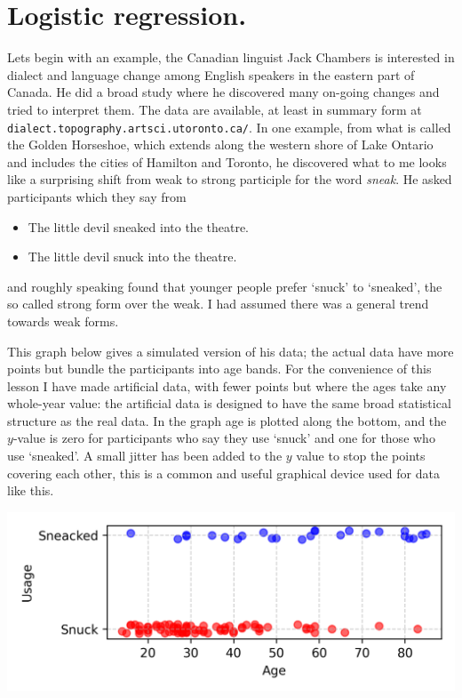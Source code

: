 \documentclass[12pt]{article}
\begin{document}
\section*{Logistic regression.} 

Lets begin with an example, the Canadian linguist Jack Chambers is
interested in dialect and language change among English speakers in
the eastern part of Canada. He did a broad study where he discovered
many on-going changes and tried to interpret them. The data are
available, at least in summary form at
\texttt{dialect.topography.artsci.utoronto.ca/}. In one example, from
what is called the Golden Horseshoe, which extends along the western
shore of Lake Ontario and includes the cities of Hamilton and Toronto,
he discovered what to me looks like a surprising shift from weak to
strong participle for the word \textsl{sneak}. He asked participants which they say from
\begin{itemize}
\item The little devil sneaked into the theatre.
\item The little devil snuck into the theatre.
\end{itemize}
and roughly speaking found that younger people prefer `snuck' to
`sneaked', the so called strong form over the weak. I had assumed
there was a general trend towards weak forms.

This graph below gives a simulated version of his data; the actual
data have more points but bundle the participants into age bands. For
the convenience of this lesson I have made artificial data, with fewer
points but where the ages take any whole-year value: the artificial
data is designed to have the same broad statistical structure as the
real data. In the graph age is plotted along the bottom, and the
$y$-value is zero for participants who say they use `snuck' and one
for those who use `sneaked'. A small jitter has been added to the $y$
value to stop the points covering each other, this is a common and
useful graphical device used for data like this.
\begin{center}
  \includegraphics[]{02.4_sneak.png}
\end{center}
\end{document}
